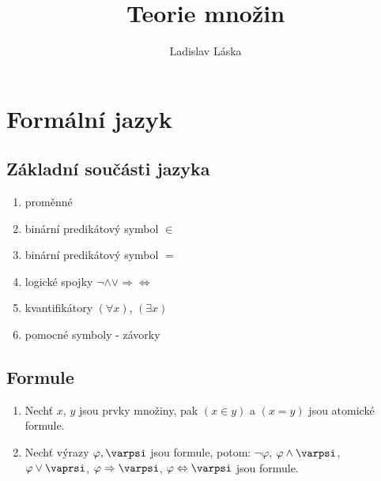 \documentclass[a4paper,12pt,titlepage]{article}
\title{Teorie množin}
\author{Ladislav Láska}
\begin{document}
\maketitle
\newpage
\tableofcontents
\newpage

\section{Formální jazyk}
\setcounter{equation}{0}
\subsection{Základní součásti jazyka}
\setcounter{equation}{0}
\begin{enumerate}
	\item proměnné
	\item binární predikátový symbol $\in$
	\item binární predikátový symbol $=$
	\item logické spojky $\neg \land \lor \Rightarrow \Leftrightarrow$
	\item kvantifikátory $(\forall x)$, $(\exists x)$
	\item pomocné symboly - závorky
\end{enumerate}
\subsection{Formule}
\setcounter{equation}{0}
\begin{enumerate}
	\item Nechť $x$, $y$ jsou prvky množiny, pak $(x \in y)$ a $(x = y)$ jsou
	atomické formule.
	\item Nechť výrazy $\varphi, \varpsi$ jsou formule, potom:
			$\neg \varphi$, $\varphi \land \varpsi$, $\varphi \lor \vaprsi$,
			$\varphi \Rightarrow \varpsi$, $\varphi \Leftrightarrow \varpsi$
			jsou formule.
\end{enumerate}
\end{document}
